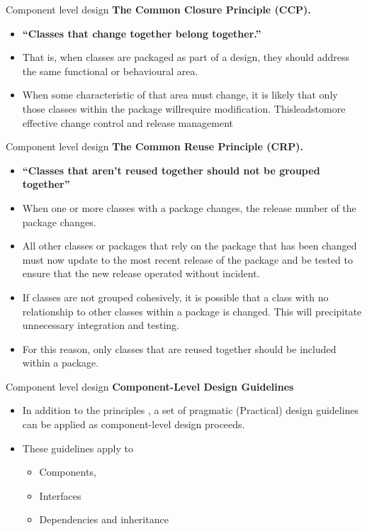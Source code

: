 \documentclass{beamer}
\begin{document}
\begin{frame}{Component level design }
	\textbf{The Common Closure Principle (CCP). }
	\begin{itemize}
		\item \textbf{“Classes that change together belong together.” }
		\item That is, when classes are packaged as part of a design, they should address 
		the same functional or behavioural area.
	\item When some characteristic of that area must change, it is likely that only
		those classes within the package willrequire modification. Thisleadstomore
		effective change control and release management
		
	\end{itemize}
\end{frame}
\begin{frame}{Component level design }
	\textbf{The Common Reuse Principle (CRP).}
	\begin{itemize}
		\item \textbf{“Classes that aren’t reused together should not be grouped together”  }
		\item  When one or more classes with a package changes, the release number of 
		the package changes.
		\item All other classes or packages that rely on the package that has been changed 
		must now update to the most recent release of the package and be tested to 
		ensure that the new release operated without incident.
		\item If classes are not grouped cohesively, it is possible that a class with no 
		relationship to other classes within a package is changed. This will precipitate
		unnecessary integration and testing.
		\item For this reason, only classes that are reused together should be included
		within a package.

	\end{itemize}
\end{frame}
\begin{frame}{Component level design }
	\textbf{Component-Level Design Guidelines}
	\begin{itemize}
		\item In addition to the principles , a set of pragmatic (Practical) design guidelines can be applied as component-level design proceeds. 
		\item These guidelines apply to 
		\begin{itemize}
			\item Components, 
			\item Interfaces 
			\item Dependencies and inheritance 
		\end{itemize}
	\end{itemize}
\end{frame}
\end{document}

